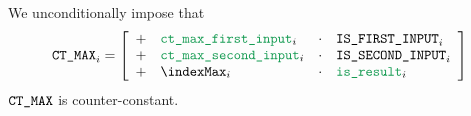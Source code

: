 We unconditionally impose that
\[
    \begin{array}{l}
        \maxCt _{i} =
        \left[ \begin{array}{clcl}
            + & \locCtMaxFirstInput  _{i} & \cdot & \isFirstInput  _{i} \\
            + & \locCtMaxSecondInput _{i} & \cdot & \isSecondInput _{i} \\
            + & \indexMax            _{i} & \cdot & \locIsResult   _{i} \\
        \end{array} \right] \\
    \end{array}
\]
\saNote{}
$\texttt{CT\_MAX}$ is counter-constant.

